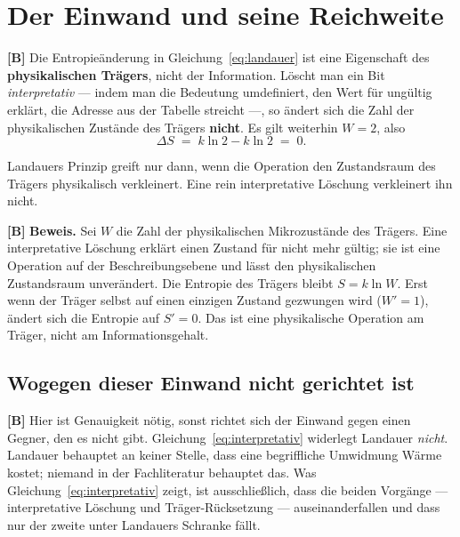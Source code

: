 \section{Der Einwand und seine Reichweite}

\textbf{[B]} Die Entropieänderung in Gleichung~\eqref{eq:landauer} ist eine Eigenschaft des
\textbf{physikalischen Trägers}, nicht der Information. Löscht man ein Bit
\emph{interpretativ} --- indem man die Bedeutung umdefiniert, den Wert für
ungültig erklärt, die Adresse aus der Tabelle streicht ---, so ändert sich die
Zahl der physikalischen Zustände des Trägers \textbf{nicht}. Es gilt weiterhin
$W = 2$, also
\begin{equation}
  \Delta S \;=\; k \ln 2 - k \ln 2 \;=\; 0 .
  \label{eq:interpretativ}
\end{equation}

\begin{theorem}
Landauers Prinzip greift nur dann, wenn die Operation den Zustandsraum des Trägers
physikalisch verkleinert. Eine rein interpretative Löschung verkleinert ihn nicht.
\end{theorem}

\textbf{[B]} \textbf{Beweis.} Sei $W$ die Zahl der physikalischen Mikrozustände des
Trägers. Eine interpretative Löschung erklärt einen Zustand für nicht mehr gültig;
sie ist eine Operation auf der Beschreibungsebene und lässt den physikalischen
Zustandsraum unverändert. Die Entropie des Trägers bleibt $S = k\ln W$. Erst wenn
der Träger selbst auf einen einzigen Zustand gezwungen wird ($W' = 1$), ändert sich
die Entropie auf $S' = 0$. Das ist eine physikalische Operation am Träger, nicht am
Informationsgehalt. \hfill\qedsq

\subsection{Wogegen dieser Einwand nicht gerichtet ist}
\label{sec:jurisdiktion}

\textbf{[B]} Hier ist Genauigkeit nötig, sonst richtet sich der Einwand gegen einen Gegner,
den es nicht gibt. Gleichung~\eqref{eq:interpretativ} widerlegt Landauer
\emph{nicht}. Landauer behauptet an keiner Stelle, dass eine begriffliche
Umwidmung Wärme kostet; niemand in der Fachliteratur behauptet das. Was
Gleichung~\eqref{eq:interpretativ} zeigt, ist ausschließlich, dass die beiden
Vorgänge --- interpretative Löschung und Träger-Rücksetzung --- auseinanderfallen
und dass nur der zweite unter Landauers Schranke fällt.

